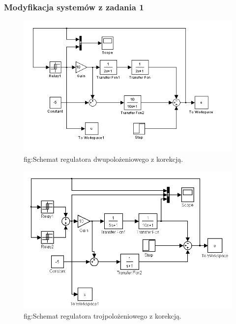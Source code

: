 \documentclass[a4paper,10pt]{article}
\begin{document}
\subsubsection{Modyfikacja systemów z zadania 1}\label{sec:zad2_1}
\begin{figure}[!h]
    \centering
	\includegraphics[width=120mm]{CW3-schemat-2k.png}
	\caption{fig:Schemat regulatora dwupolożeniowego z korekcją.}
    \label{fig:Rysunek}
\end{figure}
\begin{figure}[!h]
    \centering
	\includegraphics[width=120mm]{CW3-schemat-3k.png}
	\caption{fig:Schemat regulatora trojpolożeniowego z korekcją.}
    \label{fig:Rysunek}
\end{figure}
\end{document}
